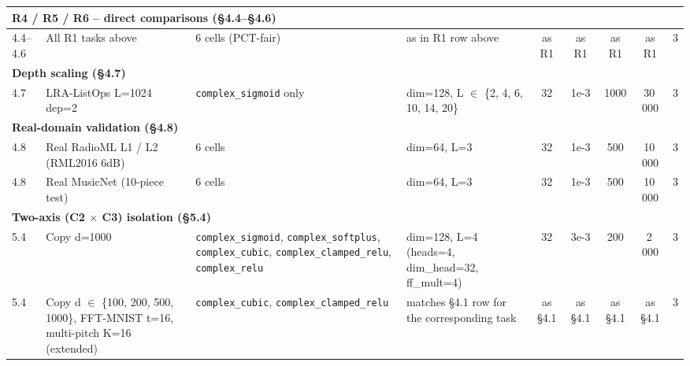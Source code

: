 \documentclass[11pt,a4paper]{article}
\theoremstyle{plain}
\theoremstyle{definition}
\begin{document}
\begin{table}[H]
\begin{adjustbox}{max width=\textwidth}
\begin{tabular}{|l|p{2.6cm}|p{2.0cm}|p{2.2cm}|c|c|c|c|c|}
\hline
\multicolumn{9}{|l|}{\textbf{R4 / R5 / R6 -- direct comparisons (\S 4.4--\S 4.6)}} \\
\hline
4.4--4.6 & All R1 tasks above & 6 cells (PCT-fair) & as in R1 row above & as R1 & as R1 & as R1 & as R1 & 3 \\
\hline
\multicolumn{9}{|l|}{\textbf{Depth scaling (\S 4.7)}} \\
\hline
4.7 & LRA-ListOps L=1024 dep=2 & \texttt{complex\_sigmoid} only & dim=128, L $\in$ \{2, 4, 6, 10, 14, 20\} & 32 & 1e-3 & 1000 & 30\,000 & 3 \\
\hline
\multicolumn{9}{|l|}{\textbf{Real-domain validation (\S 4.8)}} \\
\hline
4.8 & Real RadioML L1 / L2 (RML2016 6dB) & 6 cells & dim=64, L=3 & 32 & 1e-3 & 500 & 10\,000 & 3 \\
\hline
4.8 & Real MusicNet (10-piece test) & 6 cells & dim=64, L=3 & 32 & 1e-3 & 500 & 10\,000 & 3 \\
\hline
\multicolumn{9}{|l|}{\textbf{Two-axis (C2 $\times$ C3) isolation (\S 5.4)}} \\
\hline
5.4 & Copy d=1000 & \texttt{complex\_sigmoid}, \texttt{complex\_softplus}, \texttt{complex\_cubic}, \texttt{complex\_clamped\_relu}, \texttt{complex\_relu} & dim=128, L=4 (heads=4, dim\_head=32, ff\_mult=4) & 32 & 3e-3 & 200 & 2\,000 & 3 \\
\hline
5.4 & Copy d $\in$ \{100, 200, 500, 1000\}, FFT-MNIST t=16, multi-pitch K=16 (extended) & \texttt{complex\_cubic}, \texttt{complex\_clamped\_relu} & matches \S 4.1 row for the corresponding task & as \S 4.1 & as \S 4.1 & as \S 4.1 & as \S 4.1 & 3 \\
\hline
\end{tabular}
\end{adjustbox}
\end{table}
\end{document}
